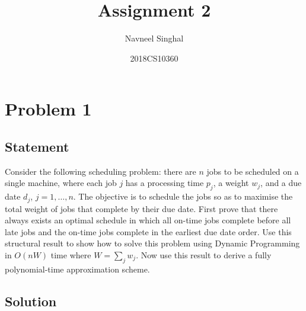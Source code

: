 \documentclass[a4paper]{article}
\title{\textbf{Assignment 2}}
\author{Navneel Singhal}
\date{2018CS10360}
\begin{document}
\maketitle
\tableofcontents

\newpage




\section{Problem 1}
\subsection{Statement}
Consider the following scheduling problem: there are $n$ jobs to be scheduled on a single machine, where each job $j$ has a processing time $p_j$, a weight $w_j$, and a due date $d_j$, $j = 1,
\ldots, n$. The objective is to schedule the jobs so as to maximise the total weight of jobs that complete by their due date. First prove that there always exists an optimal schedule in which
all on-time jobs complete before all late jobs and the on-time jobs complete in the earliest due date order. Use this structural result to show how to solve this problem using Dynamic
Programming in $O(nW)$ time where $W = \sum_j w_j$. Now use this result to derive a fully polynomial-time approximation scheme.
\subsection{Solution}
\newpage
\end{document}
